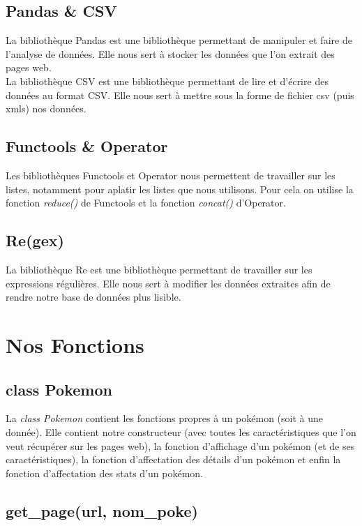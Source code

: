 \documentclass[a4paper, titlepage]{report}
\begin{document}
\subsection*{Pandas \& CSV}
\textnormal{La bibliothèque Pandas est une bibliothèque permettant de manipuler et faire de l'analyse de données. Elle nous sert à stocker les données que l'on extrait des pages web.\\
La bibliothèque CSV est une bibliothèque permettant de lire et d'écrire des données au format CSV. Elle nous sert à mettre sous la forme de fichier csv (puis xmls) nos données.}

\subsection*{Functools \& Operator}
\textnormal{Les bibliothèques Functools et Operator nous permettent de travailler sur les listes, notamment pour aplatir les listes que nous utilisons. Pour cela on utilise la fonction \textit{reduce()} de Functools et la fonction \textit{concat()} d'Operator.}

\subsection*{Re(gex)}
\textnormal{La bibliothèque Re est une bibliothèque permettant de travailler sur les expressions régulières. Elle nous sert à modifier les données extraites afin de rendre notre base de données plus lisible.}

\section*{Nos Fonctions}

\subsection*{class Pokemon}
\textnormal{La \textit{class Pokemon} contient les fonctions propres à un pokémon (soit à une donnée). Elle contient notre constructeur (avec toutes les caractéristiques que l'on veut récupérer sur les pages web), la fonction d'affichage d'un pokémon (et de ses caractéristiques), la fonction d'affectation des détails d'un pokémon et enfin la fonction d'affectation des stats d'un pokémon.}

\subsection*{get\_page(url, nom\_poke)}
\textnormal{}
\end{document}
